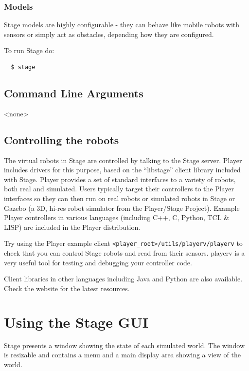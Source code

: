 \documentclass[letter,11pt,twoside]{report}
\begin{document}
\subsection{Models}

 Stage models are highly configurable - they can behave like mobile
robots with sensors or simply act as obstacles, depending how they are
configured.




 To run Stage do:
 \begin{verbatim} 
  $ stage
 \end{verbatim} 

\section{Command Line Arguments}

<none>

\section{Controlling the robots}

The virtual robots in Stage are controlled by talking to the Stage
server. Player includes drivers for this purpose, based on the
``libstage'' client library included with Stage. Player provides a set
of standard interfaces to a variety of robots, both real and
simulated. Users typically target their controllers to the Player
interfaces so they can then run on real robots or simulated robots in
Stage or Gazebo (a 3D, hi-res robot simulator from the Player/Stage
Project). Example Player controllers in various languages (including C++,
C, Python, TCL \& LISP) are included in the Player distribution.

Try using the Player example client
\verb+<player_root>/utils/playerv/playerv+ to check that you can control
Stage robots and read from their sensors. playerv is a very useful
tool for testing and debugging your controller code.

Client libraries in other languages including Java and Python are also
available. Check the website for the latest resources.


\chapter{Using the Stage GUI}

Stage presents a window showing the state of each simulated world. The
window is resizable and contains a menu and a main display area
showing a view of the world.
\end{document}
